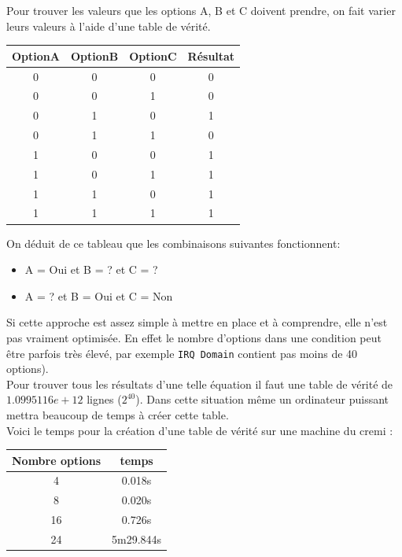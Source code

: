 \documentclass[16pts]{report}
\begin{document}
Pour trouver les valeurs que les options A, B et C doivent prendre, on fait
varier leurs valeurs à l'aide d'une table de vérité.  \\
\begin{tabular}{|c|c|c||c|}
    \hline
    OptionA & OptionB & OptionC & Résultat\\
    \hline
    \hline
    0 & 0 & 0 & 0\\
    \hline
    0 & 0 & 1 & 0\\
    \hline
    0 & 1 & 0 & 1\\
    \hline
    0 & 1 & 1 & 0\\
    \hline
    1 & 0 & 0 & 1\\
    \hline
    1 & 0 & 1 & 1\\
    \hline
    1 & 1 & 0 & 1\\
    \hline
    1 & 1 & 1 & 1\\
    \hline
\end{tabular}

On déduit de ce tableau que les combinaisons suivantes fonctionnent:
\begin{itemize}
    \item A = Oui et B = ?   et C = ?   \\
    \item A = ?   et B = Oui et C = Non \\
\end{itemize}

Si cette approche est assez simple à mettre en place et à comprendre, elle
n'est pas vraiment optimisée. En effet le nombre d'options dans une condition
peut être parfois très élevé, par exemple \verb|IRQ Domain| contient pas
moins de 40 options).\\
Pour trouver tous les résultats d'une telle équation il faut une table
de vérité de $1.0995116e+12$ lignes ($2^{40}$). Dans cette situation même
un ordinateur puissant mettra beaucoup de temps à créer cette table.
\\
Voici le temps pour la création d'une table de vérité sur une machine du cremi : 

\begin{tabular}{|c|c|}
    \hline
    Nombre options & temps\\
    \hline
    \hline
    4 & 0.018s\\
    \hline
    8 & 0.020s\\
    \hline
    16 & 0.726s\\
    \hline
    24 & 5m29.844s\\
    \hline
\end{tabular}
\end{document}
